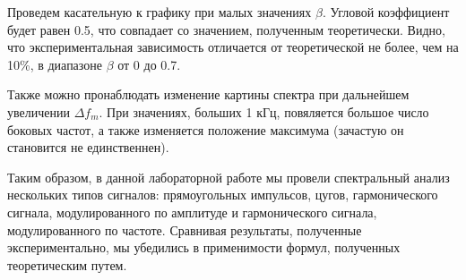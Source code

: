 \documentclass[14pt]{article}
\begin{document}
\vspace{1cm}

\vspace{1cm}
Проведем касательную к графику при малых значениях $\beta$. Угловой коэффициент будет равен 0.5, что совпадает со значением, полученным теоретически. Видно, что экспериментальная зависимость отличается от теоретической не более, чем на 10\%, в диапазоне $\beta$ от 0 до 0.7. 

\vspace{1cm}
Также можно пронаблюдать изменение картины спектра при дальнейшем увеличении $\Delta f_m$. При значениях, больших 1 кГц, повяляется большое число боковых частот, а также изменяется положение максимума (зачастую он становится не единственнен).

\newpage
Таким образом, в данной лабораторной работе мы провели спектральный анализ нескольких типов сигналов: прямоугольных импульсов, цугов, гармонического сигнала, модулированного по амплитуде и гармонического сигнала, модулированного по частоте. Сравнивая результаты, полученные экспериментально, мы убедились в применимости формул, полученных теоретическим путем. 
\end{document}
